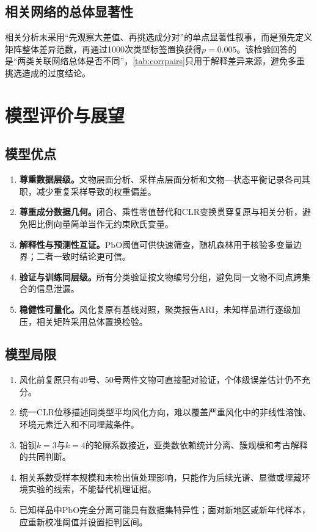 \documentclass[UTF8,a4paper,zihao=-4,fontset=windows]{ctexart}
\begin{document}
\subsection{相关网络的总体显著性}

相关分析未采用“先观察大差值、再挑选成分对”的单点显著性叙事，而是预先定义矩阵整体差异范数，再通过1000次类型标签置换获得$p=0.005$。该检验回答的是“两类关联网络总体是否不同”，\cref{tab:corrpairs}只用于解释差异来源，避免多重挑选造成的过度结论。

\section{模型评价与展望}

\subsection{模型优点}

\begin{enumerate}
  \item \textbf{尊重数据层级。}文物层面分析、采样点层面分析和文物—状态平衡记录各司其职，减少重复采样导致的权重偏差。
  \item \textbf{尊重成分数据几何。}闭合、乘性零值替代和CLR变换贯穿复原与相关分析，避免把比例向量简单当作无约束欧氏变量。
  \item \textbf{解释性与预测性互证。}$\mathrm{PbO}$阈值可供快速筛查，随机森林用于核验多变量边界；二者一致时结论更可信。
  \item \textbf{验证与训练同层级。}所有分类验证按文物编号分组，避免同一文物不同点跨集合的信息泄漏。
  \item \textbf{稳健性可量化。}风化复原有基线对照，聚类报告ARI，未知样品进行逐级加压，相关矩阵采用总体置换检验。
\end{enumerate}

\subsection{模型局限}

\begin{enumerate}
  \item 风化前复原只有49号、50号两件文物可直接配对验证，个体级误差估计仍不充分。
  \item 统一CLR位移描述同类型平均风化方向，难以覆盖严重风化中的非线性溶蚀、环境元素迁入和不同埋藏条件。
  \item 铅钡$k=3$与$k=4$的轮廓系数接近，亚类数依赖统计分离、簇规模和考古解释的共同判断。
  \item 相关系数受样本规模和未检出值处理影响，只能作为后续光谱、显微或埋藏环境实验的线索，不能替代机理证据。
  \item 已知样品中$\mathrm{PbO}$完全分离可能具有数据集特异性；面对新地区或新年代样本，应重新校准阈值并设置拒判区间。
\end{enumerate}
\end{document}
